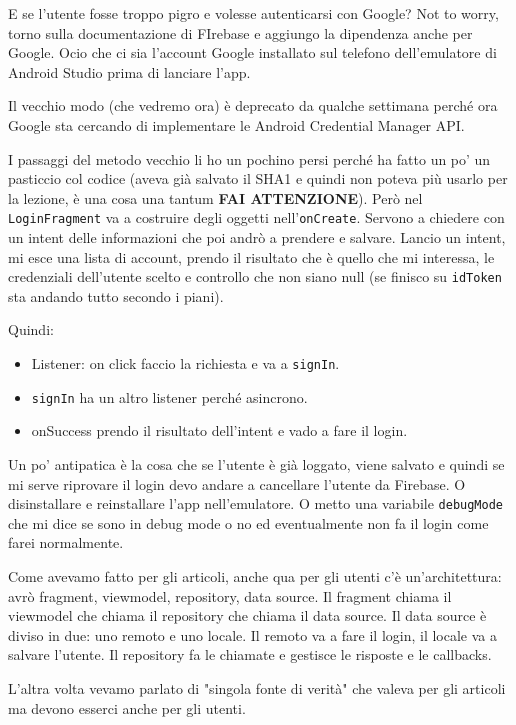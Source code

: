 \par E se l'utente fosse troppo pigro e volesse autenticarsi con Google? Not to worry, torno sulla documentazione di FIrebase e aggiungo la dipendenza anche per Google. Ocio che ci sia l'account Google installato sul telefono dell'emulatore di Android Studio prima di lanciare l'app.
\par Il vecchio modo (che vedremo ora) è deprecato da qualche settimana perché ora Google sta cercando di implementare le Android Credential Manager API. 
\par I passaggi del metodo vecchio li ho un pochino persi perché ha fatto un po' un pasticcio col codice (aveva già salvato il SHA1 e quindi non poteva più usarlo per la lezione, è una cosa una tantum \textbf{FAI ATTENZIONE}). Però nel \texttt{LoginFragment} va a costruire degli oggetti nell'\texttt{onCreate}. Servono a chiedere con un intent delle informazioni che poi andrò a prendere e salvare. Lancio un intent, mi esce una lista di account, prendo il risultato che è quello che mi interessa, le credenziali dell'utente scelto e controllo che non siano null (se finisco su \texttt{idToken} sta andando tutto secondo i piani).
\par Quindi:
\begin{itemize}
    \item Listener: on click faccio la richiesta e va a \texttt{signIn}.
    \item \texttt{signIn} ha un altro listener perché asincrono.
    \item onSuccess prendo il risultato dell'intent e vado a fare il login.
\end{itemize}
\par Un po' antipatica è la cosa che se l'utente è già loggato, viene salvato e quindi se mi serve riprovare il login devo andare a cancellare l'utente da Firebase. O disinstallare e reinstallare l'app nell'emulatore. O metto una variabile \texttt{debugMode} che mi dice se sono in debug mode o no ed eventualmente non fa il login come farei normalmente.
\par Come avevamo fatto per gli articoli, anche qua per gli utenti c'è un'architettura: avrò fragment, viewmodel, repository, data source. Il fragment chiama il viewmodel che chiama il repository che chiama il data source. Il data source è diviso in due: uno remoto e uno locale. Il remoto va a fare il login, il locale va a salvare l'utente. Il repository fa le chiamate e gestisce le risposte e le callbacks.
\par L'altra volta vevamo parlato di "singola fonte di verità" che valeva per gli articoli ma devono esserci anche per gli utenti.
